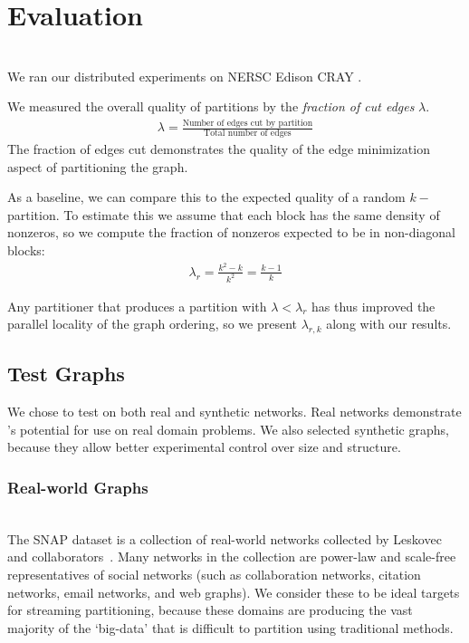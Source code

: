 \section{Evaluation}
\\

We ran our distributed experiments on NERSC Edison CRAY .


We measured the overall quality of partitions by the \textit{fraction of cut edges} $\lambda$.
\begin{align}\lambda = \frac{\text{Number of edges cut by partition}}{\text{Total number of edges}}\end{align}
The fraction of edges cut demonstrates the quality of the edge minimization aspect of partitioning the graph.

As a baseline, we can compare this to the expected quality of a random $k-$partition.
To estimate this we assume that each block has the same density of nonzeros, so we compute the fraction of nonzeros expected to be in non-diagonal blocks:
\begin{align}\lambda_r = \frac{k^2 - k}{k^2} = \frac{k-1}{k} \end{align}

Any partitioner that produces a partition with $\lambda < \lambda_r$ has thus improved the parallel locality of the graph ordering, so we present $\lambda_{r,k}$ along with our results.

\subsection{Test Graphs}
We chose to test on both real and synthetic networks.
Real networks demonstrate \ourmethod's potential for use on real domain problems.
We also selected synthetic graphs, because they allow better experimental control over size and structure.
\subsubsection{Real-world Graphs}
\\
The SNAP dataset is a collection of real-world networks collected by Leskovec and collaborators~\cite{Leskovec-data}. 
Many networks in the collection are power-law and scale-free representatives of social networks (such as collaboration networks, citation networks, email networks, and web graphs). We consider these to be ideal targets for streaming partitioning, because these domains are producing the vast majority of the `big-data' that is difficult to partition using traditional methods.

